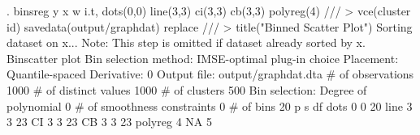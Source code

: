 . binsreg y x w i.t, dots(0,0) line(3,3) ci(3,3) cb(3,3) polyreg(4) ///
>                    vce(cluster id) savedata(output/graphdat) replace ///
>                                    title("Binned Scatter Plot") 
Sorting dataset on x...
Note: This step is omitted if dataset already sorted by x.
{\smallskip}
Binscatter plot
Bin selection method: IMSE-optimal plug-in choice
Placement: Quantile-spaced
Derivative: 0
Output file: output/graphdat.dta
{\smallskip}
\# of observations             {\VBAR}    1000
\# of distinct values          {\VBAR}    1000
\# of clusters                 {\VBAR}     500
Bin selection:                {\VBAR} 
         Degree of polynomial {\VBAR}       0
  \# of smoothness constraints {\VBAR}       0
                    \# of bins {\VBAR}      20
{\smallskip}
         {\VBAR}      p       s       df
 dots    {\VBAR}      0       0       20
 line    {\VBAR}      3       3       23
 CI      {\VBAR}      3       3       23
 CB      {\VBAR}      3       3       23
 polyreg {\VBAR}      4       NA      5
